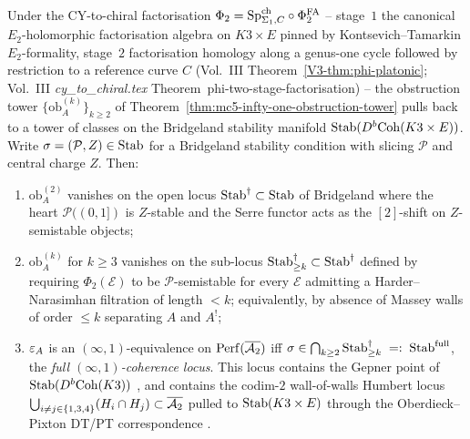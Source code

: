 \begin{theorem}
\label{thm:mc5-bridgeland-slicing-reads-obstruction-tower}
\ClaimStatusProvedHere{}%
Under the CY-to-chiral factorisation
$\Phi_2 = \mathrm{Sp}^{\mathrm{ch}}_{\Sigma_1, C} \circ \Phi^{\mathrm{FA}}_2$ -- stage~$1$ the
canonical $E_2$-holomorphic factorisation algebra on $K3 \times E$
pinned by Kontsevich--Tamarkin $E_2$-formality, stage~$2$
factorisation homology along a genus-one cycle followed by
restriction to a reference curve $C$
(Vol.~III Theorem~\textup{\ref{V3-thm:phi-platonic}}; Vol.~III
\textit{cy\_to\_chiral.tex} Theorem~\textup{phi-two-stage-factorisation}) --
the obstruction
tower $\{\mathrm{ob}^{(k)}_A\}_{k\ge 2}$ of
Theorem~\textup{\ref{thm:mc5-infty-one-obstruction-tower}} pulls
back to a tower of classes on the Bridgeland stability manifold
$\mathrm{Stab}(D^b\mathrm{Coh}(K3\times E))$. Write
$\sigma=(\mathcal P,Z)\in\mathrm{Stab}$ for a Bridgeland stability
condition with slicing $\mathcal P$ and central charge $Z$. Then:
\begin{enumerate}
\item $\mathrm{ob}^{(2)}_A$ vanishes on the open locus
$\mathrm{Stab}^\dagger\subset\mathrm{Stab}$ of Bridgeland
\cite[]{Bridgeland2007AnnMath} where the heart
$\mathcal P((0,1])$ is $Z$-stable and the Serre functor acts as the
$[2]$-shift on $Z$-semistable objects;
\item $\mathrm{ob}^{(k)}_A$ for $k\ge 3$ vanishes on the sub-locus
$\mathrm{Stab}^\dagger_{\ge k}\subset\mathrm{Stab}^\dagger$ defined by requiring
$\Phi_2(\mathcal E)$ to be $\mathcal P$-semistable for every
$\mathcal E$ admitting a Harder--Narasimhan filtration of length
$<k$; equivalently, by absence of Massey walls of order $\le k$
separating $A$ and $A^!$;
\item $\varepsilon_A$ is an $(\infty,1)$-equivalence on
$\mathrm{Perf}(\overline{\mathcal{A}_2})$ iff $\sigma\in\bigcap_{k\ge 2}
\mathrm{Stab}^\dagger_{\ge k}\;=:\;\mathrm{Stab}^{\mathrm{full}}$, the
\emph{full $(\infty,1)$-coherence locus}. This locus contains the
Gepner point of $\mathrm{Stab}(D^b\mathrm{Coh}(K3))$
\cite[Prop.~5.1]{BridgelandMacri2011}, and contains the
codim-$2$ wall-of-walls Humbert locus
$\bigcup_{i\neq j\in\{1,3,4\}}(H_i\cap H_j)\subset\overline{\mathcal{A}_2}$
pulled to $\mathrm{Stab}(K3\times E)$ through the Oberdieck--Pixton DT/PT
correspondence \cite{OberdieckPixton2019InventMath}.
\end{enumerate}
\end{theorem}


